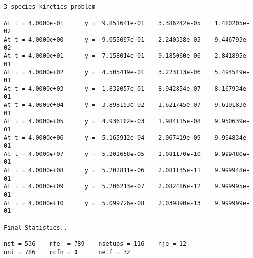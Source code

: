 \begin{verbatim}
3-species kinetics problem

At t = 4.0000e-01      y =  9.851641e-01    3.386242e-05    1.480205e-02
At t = 4.0000e+00      y =  9.055097e-01    2.240338e-05    9.446793e-02
At t = 4.0000e+01      y =  7.158014e-01    9.185060e-06    2.841895e-01
At t = 4.0000e+02      y =  4.505419e-01    3.223113e-06    5.494549e-01
At t = 4.0000e+03      y =  1.832057e-01    8.942854e-07    8.167934e-01
At t = 4.0000e+04      y =  3.898153e-02    1.621745e-07    9.610183e-01
At t = 4.0000e+05      y =  4.936102e-03    1.984115e-08    9.950639e-01
At t = 4.0000e+06      y =  5.165912e-04    2.067419e-09    9.994834e-01
At t = 4.0000e+07      y =  5.202658e-05    2.081170e-10    9.999480e-01
At t = 4.0000e+08      y =  5.202811e-06    2.081135e-11    9.999948e-01
At t = 4.0000e+09      y =  5.206213e-07    2.082486e-12    9.999995e-01
At t = 4.0000e+10      y =  5.099726e-08    2.039890e-13    9.999999e-01

Final Statistics.. 

nst = 536    nfe  = 789    nsetups = 116    nje = 12
nni = 786    ncfn = 0      netf = 32
\end{verbatim}